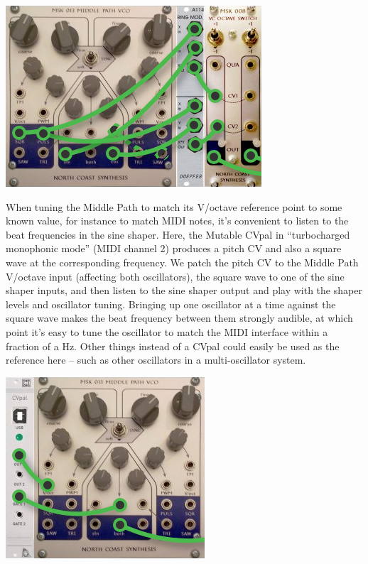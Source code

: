 \nopagebreak\noindent
{\hspace*{\fill}\includegraphics[scale=0.4]{mp-patch6.png}\hspace*{\fill}\par} 

When tuning the Middle Path to match its V/octave reference point to some
known value, for instance to match MIDI notes, it's convenient to listen to
the beat frequencies in the sine shaper.  Here, the Mutable CVpal in
``turbocharged monophonic mode'' (MIDI channel 2) produces a pitch CV and
also a square wave at the corresponding frequency.  We patch the pitch CV to
the Middle Path V/octave input (affecting both oscillators), the square wave
to one of the sine shaper inputs, and then listen to the sine shaper output
and play with the shaper levels and oscillator tuning.  Bringing up one
oscillator at a time against the square wave makes the beat frequency
between them strongly audible, at which point it's easy to tune the
oscillator to match the MIDI interface within a fraction of a Hz.  Other
things instead of a CVpal could easily be used as the reference here -- such
as other oscillators in a multi-oscillator system.

\nopagebreak\noindent
{\hspace*{\fill}\includegraphics[scale=0.4]{mp-patch7.png}\hspace*{\fill}\par} 
